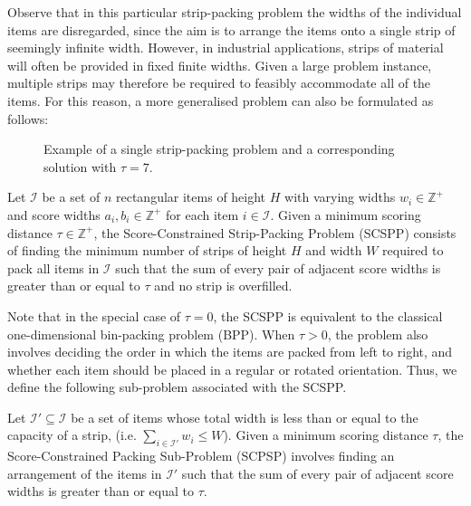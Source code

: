 \documentclass[runningheads]{llncs}
\begin{document}
Observe that in this particular strip-packing problem the widths of the individual items are disregarded, since the aim is to arrange the items onto a single strip of seemingly infinite width. However, in industrial applications, strips of material will often be provided in fixed finite widths. Given a large problem instance, multiple strips may therefore be required to feasibly accommodate all of the items. For this reason, a more generalised problem can also be formulated as follows:

\begin{figure}	
	\centering
	\begin{subfigure}[h]{0.5\textwidth}
		
		\label{fig:items}
	\end{subfigure} 
	\begin{subfigure}[h]{0.8\textwidth}
		
		\label{fig:itemsaligned}
	\end{subfigure}
	\caption{Example of a single strip-packing problem and a corresponding solution with $\tau = 7$.}
	\label{fig:items/aligned}
\end{figure}

\begin{definition}
	Let $\mathcal{I}$ be a set of $n$ rectangular items of height $H$ with varying widths $w_i \in \mathbb{Z}^+$ and score widths $a_i, b_i \in \mathbb{Z}^+$ for each item $i \in \mathcal{I}$. Given a minimum scoring distance $\tau \in \mathbb{Z}^+$, the Score-Constrained Strip-Packing Problem (SCSPP) consists of finding the minimum number of strips of height $H$ and width $W$ required to pack all items in $\mathcal{I}$ such that the sum of every pair of adjacent score widths is greater than or equal to $\tau$ and no strip is overfilled.
\end{definition}

\noindent Note that in the special case of $\tau = 0$, the SCSPP is equivalent to the classical one-dimensional bin-packing problem (BPP). When $\tau > 0$, the problem also involves deciding the order in which the items are packed from left to right, and whether each item should be placed in a regular or rotated orientation. Thus, we define the following sub-problem associated with the SCSPP.

\begin{definition}
	\label{defn:subprob}
	Let $\mathcal{I}' \subseteq \mathcal{I}$ be a set of items whose total width is less than or equal to the capacity of a strip, (i.e. $\sum_{i\in \mathcal{I}'}w_i \leq W$). Given a minimum scoring distance $\tau$, the Score-Constrained Packing Sub-Problem (SCPSP) involves finding an arrangement of the items in $\mathcal{I}'$ such that the sum of every pair of adjacent score widths is greater than or equal to $\tau$.
\end{definition}
\end{document}
